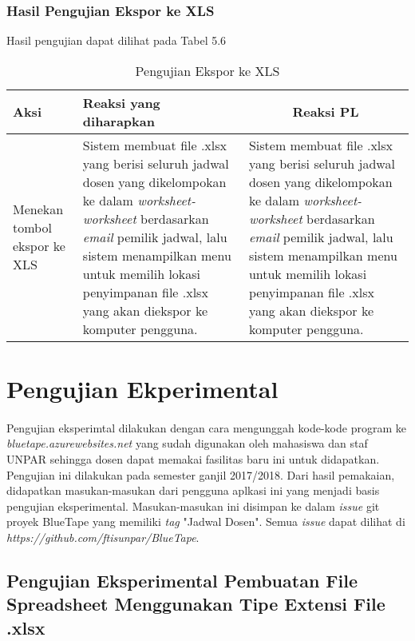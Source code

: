 \subsubsection{Hasil Pengujian Ekspor ke XLS}
Hasil pengujian dapat dilihat pada Tabel 5.6
\begin{center}
	\begin{table}[H]
	\caption{Pengujian Ekspor ke XLS}
		\begin{tabular}{|p{5cm}|p{5cm}|p{5cm}|}
		\hline
		\centering Aksi	& 	\centering Reaksi yang diharapkan &  \multicolumn{1}{c|}{Reaksi PL} \\
		\hline
		Menekan tombol ekspor ke XLS & 
		Sistem membuat file .xlsx yang berisi seluruh jadwal dosen yang dikelompokan ke dalam \textit{worksheet-worksheet} berdasarkan \textit{email} pemilik jadwal, lalu sistem  menampilkan menu untuk memilih lokasi penyimpanan file .xlsx yang akan diekspor ke komputer pengguna. &
		Sistem membuat file .xlsx yang berisi seluruh jadwal dosen yang dikelompokan ke dalam \textit{worksheet-worksheet} berdasarkan \textit{email} pemilik jadwal, lalu sistem  menampilkan menu untuk memilih lokasi penyimpanan file .xlsx yang akan diekspor ke komputer pengguna. \\
		\hline
		\end{tabular}
	\end{table}
\end{center}

\section{Pengujian Ekperimental}
\paragraph{}Pengujian eksperimtal dilakukan dengan cara mengunggah kode-kode program ke \textit{bluetape.azurewebsites.net} yang sudah digunakan oleh mahasiswa dan staf UNPAR sehingga dosen dapat memakai fasilitas baru ini untuk didapatkan. Pengujian ini dilakukan pada semester ganjil 2017/2018. Dari hasil pemakaian, didapatkan masukan-masukan dari pengguna aplkasi ini yang menjadi basis pengujian eksperimental. Masukan-masukan ini disimpan ke dalam \textit{issue} git proyek BlueTape yang memiliki \textit{tag} "Jadwal Dosen". Semua \textit{issue} dapat dilihat di \textit{https://github.com/ftisunpar/BlueTape}.

\subsection{Pengujian Eksperimental Pembuatan File Spreadsheet Menggunakan Tipe Extensi File .xlsx}
